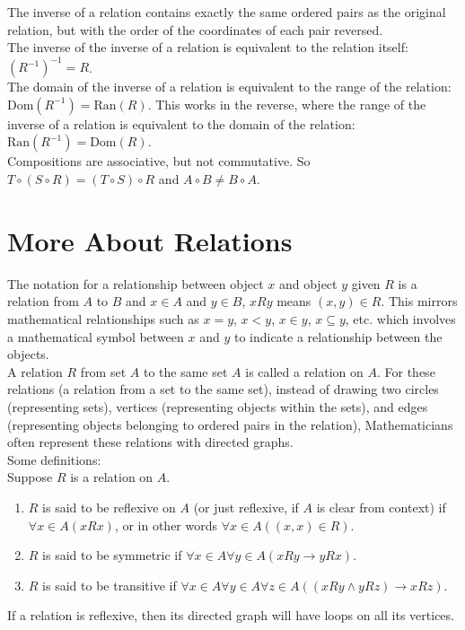 \documentclass{article}
\begin{document}
\noindent The inverse of a relation contains exactly the same ordered pairs as the original relation, but with the order of the coordinates of each pair reversed.\\

\noindent The inverse of the inverse of a relation is equivalent to the relation itself: $(R^{-1})^{-1} = R$.\\ 

\noindent The domain of the inverse of a relation is equivalent to the range of the relation: $\text{Dom}(R^{-1}) = \text{Ran}(R)$. This works in the reverse, where the range of the inverse of a relation is equivalent to the domain of the relation: $\text{Ran}(R^{-1}) = \text{Dom}(R)$.\\

\noindent Compositions are associative, but not commutative. So $T \circ (S \circ R)= (T \circ S) \circ R$ and $A \circ B \neq B \circ A$.

\section{More About Relations}
The notation for a relationship between object $x$ and object $y$ given $R$ is a relation from $A$ to $B$ and $x \in A$ and $y \in B$, $xRy$ means $(x,y) \in R$. This mirrors mathematical relationships such as $x = y$, $x < y$, $x \in y$, $x \subseteq y$, etc. which involves a mathematical symbol between $x$ and $y$ to indicate a relationship between the objects.\\

\noindent A relation $R$ from set $A$ to the same set $A$ is called a \gls{relation on} $A$. For these relations (a relation from a set to the same set), instead of drawing two circles (representing sets), vertices (representing objects within the sets), and edges (representing objects belonging to ordered pairs in the relation), Mathematicians often represent these relations with \glspl{directed graph}.\\

\noindent Some definitions:\\
Suppose $R$ is a relation on $A$.
\begin{enumerate}
    \item $R$ is said to be \gls{reflexive} on $A$ (or just reflexive, if $A$ is clear from context) if $\forall x \in A(xRx)$, or in other words $\forall x \in A((x,x) \in R)$.
    \item $R$ is said to be \gls{symmetric} if $\forall x \in A \forall y \in A(xRy \rightarrow yRx)$.
    \item $R$ is said to be \gls{transitive} if $\forall x \in A \forall y \in A \forall z \in A((xRy \land yRz) \rightarrow xRz)$.
\end{enumerate}
If a relation is reflexive, then its directed graph will have \glspl{loop} on all its vertices.\\
\end{document}
